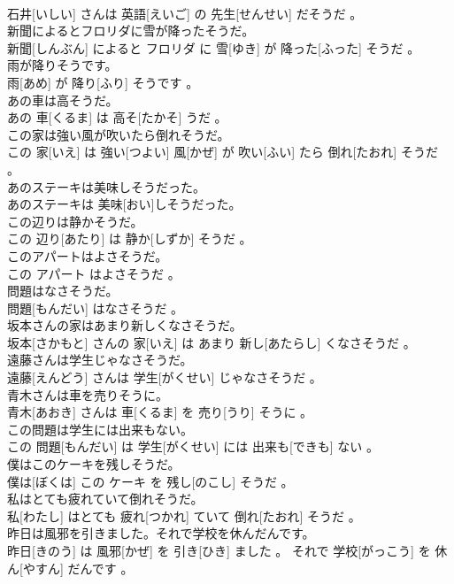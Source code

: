 \documentclass[8pt]{extreport}
\begin{document}
\begin{CJK}{UTF8}{min}
\\	石井[いしい] さんは 英語[えいご] の 先生[せんせい] だそうだ 。
\\	新聞によるとフロリダに雪が降ったそうだ。	
\\	新聞[しんぶん] によると フロリダ に 雪[ゆき] が 降った[ふった] そうだ 。
\\	雨が降りそうです。	
\\	雨[あめ] が 降り[ふり] そうです 。
\\	あの車は高そうだ。	
\\	あの 車[くるま] は 高そ[たかそ] うだ 。
\\	この家は強い風が吹いたら倒れそうだ。	
\\	この 家[いえ] は 強い[つよい] 風[かぜ] が 吹い[ふい] たら 倒れ[たおれ] そうだ 。
\\	あのステーキは美味しそうだった。	
\\	あのステーキは 美味[おい]しそうだった。
\\	この辺りは静かそうだ。	
\\	この 辺り[あたり] は 静か[しずか] そうだ 。
\\	このアパートはよさそうだ。	
\\	この アパート はよさそうだ 。
\\	問題はなさそうだ。	
\\	問題[もんだい] はなさそうだ 。
\\	坂本さんの家はあまり新しくなさそうだ。	
\\	坂本[さかもと] さんの 家[いえ] は あまり 新し[あたらし] くなさそうだ 。
\\	遠藤さんは学生じゃなさそうだ。	
\\	遠藤[えんどう] さんは 学生[がくせい] じゃなさそうだ 。
\\	青木さんは車を売りそうに。	
\\	青木[あおき] さんは 車[くるま] を 売り[うり] そうに 。
\\	この問題は学生には出来もない。	
\\	この 問題[もんだい] は 学生[がくせい] には 出来も[できも] ない 。
\\	僕はこのケーキを残しそうだ。	
\\	僕は[ぼくは] この ケーキ を 残し[のこし] そうだ 。
\\	私はとても疲れていて倒れそうだ。	
\\	私[わたし] はとても 疲れ[つかれ] ていて 倒れ[たおれ] そうだ 。
\\	昨日は風邪を引きました。それで学校を休んだんです。	
\\	昨日[きのう] は 風邪[かぜ] を 引き[ひき] ました 。 それで 学校[がっこう] を 休ん[やすん] だんです 。

\end{CJK}
\end{document}
